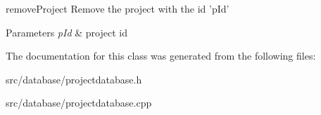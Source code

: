 remove\+Project Remove the project with the id 'p\+Id' 


\begin{DoxyParams}{Parameters}
{\em p\+Id} & project id \\
\hline
\end{DoxyParams}


The documentation for this class was generated from the following files\+:\begin{DoxyCompactItemize}
\item 
src/database/projectdatabase.\+h\item 
src/database/projectdatabase.\+cpp\end{DoxyCompactItemize}
